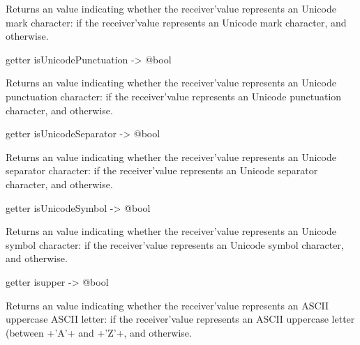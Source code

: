 Returns an  value indicating whether the receiver'value represents an Unicode mark character:  if the receiver'value represents an Unicode mark character, and  otherwise.







\begin{galgascode}
getter isUnicodePunctuation -> @bool
\end{galgascode}

Returns an  value indicating whether the receiver'value represents an Unicode punctuation character:  if the receiver'value represents an Unicode punctuation character, and  otherwise.







\begin{galgascode}
getter isUnicodeSeparator -> @bool
\end{galgascode}

Returns an  value indicating whether the receiver'value represents an Unicode separator character:  if the receiver'value represents an Unicode separator character, and  otherwise.







\begin{galgascode}
getter isUnicodeSymbol -> @bool
\end{galgascode}

Returns an  value indicating whether the receiver'value represents an Unicode symbol character:  if the receiver'value represents an Unicode symbol character, and  otherwise.










\begin{galgascode}
getter isupper -> @bool
\end{galgascode}

Returns an  value indicating whether the receiver'value represents an ASCII uppercase ASCII letter:  if the receiver'value represents an ASCII uppercase letter (between \ggs+'A'+ and \ggs+'Z'+, and  otherwise.






